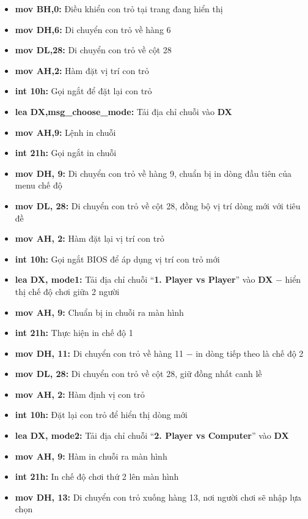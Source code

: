 \begin{itemize}
    \item \textbf{mov BH,0:} Điều khiển con trỏ tại trang đang hiển thị 
    \item \textbf{mov DH,6:} Di chuyển con trỏ về hàng 6
    \item \textbf{mov DL,28:} Di chuyển con trỏ về cột 28
    \item \textbf{mov AH,2: }Hàm đặt vị trí con trỏ
    \item \textbf{int 10h:} Gọi ngắt để đặt lại con trỏ
    \item \textbf{lea DX,msg\_choose\_mode:} Tải địa chỉ chuỗi vào \textbf{DX}
    \item \textbf{mov AH,9: }Lệnh in chuỗi
    \item \textbf{int 21h:} Gọi ngắt in chuỗi
    \item \textbf{mov DH, 9:}  Di chuyển con trỏ về hàng 9, chuẩn bị in dòng đầu tiên của menu chế độ
    \item \textbf{mov DL, 28:} Di chuyển con trỏ về cột 28, đồng bộ vị trí dòng mới với tiêu đề
    \item \textbf{mov AH, 2:} Hàm đặt lại vị trí con trỏ
    \item \textbf{int 10h:} Gọi ngắt BIOS để áp dụng vị trí con trỏ mới
    \item \textbf{lea DX, mode1:} Tải địa chỉ chuỗi “\textbf{1. Player vs Player}” vào \textbf{DX} $-$ hiển thị chế độ chơi giữa 2 người
    \item \textbf{mov AH, 9:} Chuẩn bị in chuỗi ra màn hình
    \item \textbf{int 21h:} Thực hiện in chế độ 1
    \item \textbf{mov DH, 11:} Di chuyển con trỏ về hàng 11 $-$ in dòng tiếp theo là chế độ 2
    \item \textbf{mov DL, 28:} Di chuyển con trỏ về cột 28, giữ đồng nhất canh lề
    \item \textbf{mov AH, 2:} Hàm định vị con trỏ
    \item \textbf{int 10h:} Đặt lại con trỏ để hiển thị dòng mới
    \item \textbf{lea DX, mode2:} Tải địa chỉ chuỗi “\textbf{2. Player vs Computer}” vào \textbf{DX}
    \item \textbf{mov AH, 9:} Hàm in chuỗi ra màn hình
    \item \textbf{int 21h:} In chế độ chơi thứ 2 lên màn hình
    \item \textbf{mov DH, 13:} Di chuyển con trỏ xuống hàng 13, nơi người chơi sẽ nhập lựa chọn

\end{itemize}
